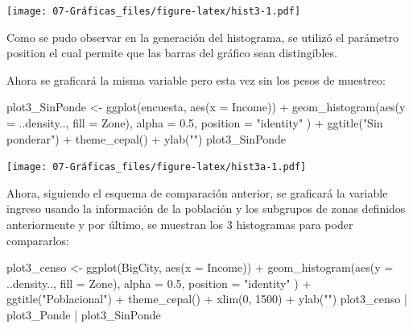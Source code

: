 \documentclass[
  12pt,
]{book}
\newenvironment{Shaded}{\begin{snugshade}}{\end{snugshade}}
\newcommand{\AttributeTok}[1]{\textcolor[rgb]{0.77,0.63,0.00}{#1}}
\newcommand{\DecValTok}[1]{\textcolor[rgb]{0.00,0.00,0.81}{#1}}
\newcommand{\FloatTok}[1]{\textcolor[rgb]{0.00,0.00,0.81}{#1}}
\newcommand{\FunctionTok}[1]{\textcolor[rgb]{0.00,0.00,0.00}{#1}}
\newcommand{\NormalTok}[1]{#1}
\newcommand{\OtherTok}[1]{\textcolor[rgb]{0.56,0.35,0.01}{#1}}
\newcommand{\SpecialCharTok}[1]{\textcolor[rgb]{0.00,0.00,0.00}{#1}}
\newcommand{\StringTok}[1]{\textcolor[rgb]{0.31,0.60,0.02}{#1}}
\begin{document}
\texttt{[image: 07-Gráficas\_files/figure-latex/hist3-1.pdf]}

Como se pudo observar en la generación del histograma, se utilizó el parámetro position el cual permite que las barras del gráfico sean distingibles.

Ahora se graficará la misma variable pero esta vez sin los pesos de muestreo:

\begin{Shaded}
\begin{Highlighting}[]
\NormalTok{plot3\_SinPonde }\OtherTok{\textless{}{-}} \FunctionTok{ggplot}\NormalTok{(encuesta, }\FunctionTok{aes}\NormalTok{(}\AttributeTok{x =}\NormalTok{ Income)) }\SpecialCharTok{+}
  \FunctionTok{geom\_histogram}\NormalTok{(}\FunctionTok{aes}\NormalTok{(}\AttributeTok{y =}\NormalTok{ ..density.., }\AttributeTok{fill =}\NormalTok{ Zone),}
    \AttributeTok{alpha =} \FloatTok{0.5}\NormalTok{, }\AttributeTok{position =} \StringTok{"identity"}
\NormalTok{  ) }\SpecialCharTok{+}
  \FunctionTok{ggtitle}\NormalTok{(}\StringTok{"Sin ponderar"}\NormalTok{) }\SpecialCharTok{+}
  \FunctionTok{theme\_cepal}\NormalTok{() }\SpecialCharTok{+}
  \FunctionTok{ylab}\NormalTok{(}\StringTok{""}\NormalTok{)}
\NormalTok{plot3\_SinPonde}
\end{Highlighting}
\end{Shaded}

\texttt{[image: 07-Gráficas\_files/figure-latex/hist3a-1.pdf]}

Ahora, siguiendo el esquema de comparación anterior, se graficará la variable ingreso usando la información de la población y los subgrupos de zonas definidos anteriormente y por último, se muestran los 3 histogramas para poder compararlos:

\begin{Shaded}
\begin{Highlighting}[]
\NormalTok{plot3\_censo }\OtherTok{\textless{}{-}} \FunctionTok{ggplot}\NormalTok{(BigCity, }\FunctionTok{aes}\NormalTok{(}\AttributeTok{x =}\NormalTok{ Income)) }\SpecialCharTok{+}
  \FunctionTok{geom\_histogram}\NormalTok{(}\FunctionTok{aes}\NormalTok{(}\AttributeTok{y =}\NormalTok{ ..density.., }\AttributeTok{fill =}\NormalTok{ Zone),}
    \AttributeTok{alpha =} \FloatTok{0.5}\NormalTok{, }\AttributeTok{position =} \StringTok{"identity"}
\NormalTok{  ) }\SpecialCharTok{+}
  \FunctionTok{ggtitle}\NormalTok{(}\StringTok{"Poblacional"}\NormalTok{) }\SpecialCharTok{+}
  \FunctionTok{theme\_cepal}\NormalTok{() }\SpecialCharTok{+}
  \FunctionTok{xlim}\NormalTok{(}\DecValTok{0}\NormalTok{, }\DecValTok{1500}\NormalTok{) }\SpecialCharTok{+}
  \FunctionTok{ylab}\NormalTok{(}\StringTok{""}\NormalTok{)}
\NormalTok{plot3\_censo }\SpecialCharTok{|}\NormalTok{ plot3\_Ponde }\SpecialCharTok{|}\NormalTok{ plot3\_SinPonde}
\end{Highlighting}
\end{Shaded}
\end{document}
